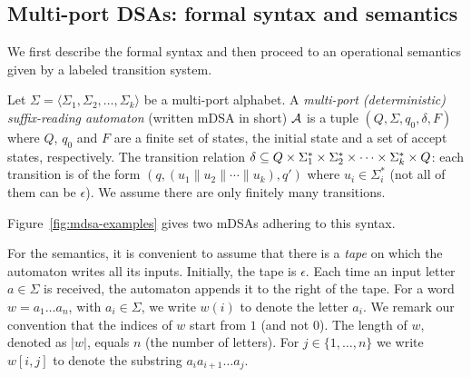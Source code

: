
\subsection{Multi-port DSAs: formal syntax and semantics} 

We first describe the formal syntax and then proceed to an operational semantics given by a labeled transition system.

\begin{definition} Let
  $\Sigma = \langle \Sigma_1, \Sigma_2, \dots, \Sigma_k \rangle$ be a
  multi-port alphabet. A \emph{multi-port (deterministic)
    suffix-reading automaton} (written mDSA in short) $\mathcal{A}$ is a
  tuple $(Q, \Sigma, q_0, \delta, F)$ where $Q$, $q_0$ and
  $F$ are a finite set of states, the initial state and a set of
  accept states, respectively. %
  The transition relation
  $\delta \subseteq Q \times \Sigma_1^* \times \Sigma_2^* \times \cdots
  \times \Sigma_k^* \times Q$: each transition is of the form
  $(q, (u_1 \parallel u_2 \parallel \cdots \parallel u_k), q')$ where
  $u_i \in \Sigma_i^*$ (not all of them can be $\epsilon$). %
  We assume there are only finitely many transitions. %
 \end{definition}%
Figure~\ref{fig:mdsa-examples} gives two mDSAs adhering to this syntax. %

 For the semantics, it is convenient to assume that there is a \emph{tape} on which the automaton writes all its inputs. Initially, the tape is $\epsilon$. Each time an input letter $a \in \Sigma$ is received, the automaton appends it to the right of the tape. 
 For a word $w = a_1 \dots a_{n}$, with $a_i \in \Sigma$, we write $w(i)$ to denote the letter $a_i$. We remark our convention that the indices of $w$ start from $1$ (and not $0$). The length of $w$, denoted as $|w|$, equals $n$ (the number of letters). For $j \in \{1, \dots, n\}$ we write $w[i, j]$ to denote the substring $a_i a_{i+1} \dots a_j$.

